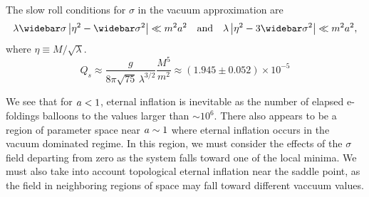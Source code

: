 The slow roll conditions for $\sigma$ in the vacuum approximation are
\[ \lambda \widebar\sigma \abs{\eta^2 - \widebar\sigma^2} \ll m^2 \aaa^2 \quad\text{and}\quad \lambda \abs{\eta^2 - 3\widebar\sigma^2} \ll m^2 \aaa^2,\]
where $\eta \equiv M/\sqrt{\lambda}$.
\[ Q_s \approx \dfrac{g} {8\pi\sqrt{75} \, \lambda^{3/2}} \dfrac{ M^5 }{ m^2 } \approx (1.945 \pm 0.052) \times 10^{-5} \]



We see that for $a < 1$, eternal inflation is inevitable as the number of elapsed e-foldings balloons to the values larger than $\sim 10^6$.  There also appears to be a region of parameter space near $a \sim 1$ where eternal inflation occurs in the vacuum dominated regime.  In this region, we must consider the effects of the $\sigma$ field departing from zero as the system falls toward one of the local minima.  We must also take into account topological eternal inflation near the saddle point, as the field in neighboring regions of space may fall toward different vaccuum values.

